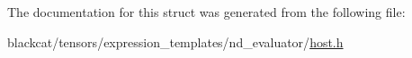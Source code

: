 The documentation for this struct was generated from the following file\+:\begin{DoxyCompactItemize}
\item 
blackcat/tensors/expression\+\_\+templates/nd\+\_\+evaluator/\hyperlink{tensors_2expression__templates_2nd__evaluator_2host_8h}{host.\+h}\end{DoxyCompactItemize}
